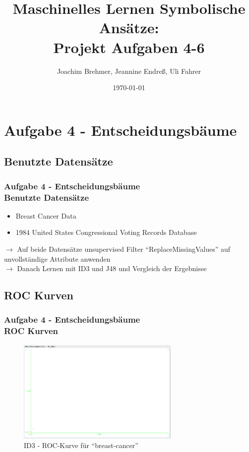 \documentclass[accentcolor=tud6b,colorbacktitle,inverttitle,landscape,german,presentation,t]{tudbeamer}
\begin{document}
\title[MLDM: Projekt Aufg 4-6]{Maschinelles Lernen Symbolische Ansätze:\\ Projekt Aufgaben 4-6}
\subtitle{}

\author[brehmer\_endreß\_fahrer]{Joachim Brehmer, Jeannine Endreß, Uli Fahrer}

\date{\today}

\begin{titleframe}
\tableofcontents
\end{titleframe}

    \section{Aufgabe 4 - Entscheidungsbäume}
    
    \subsection{Benutzte Datensätze}
    
    \begin{frame}[t]
    \frametitle{Aufgabe 4 - Entscheidungsbäume\\ Benutzte Datensätze}
        \begin{itemize}
            \item Breast Cancer Data
            \item 1984 United States Congressional Voting Records Database
        \end{itemize}
        \vfill
        $\rightarrow$ Auf beide Datensätze unsupervised Filter ``ReplaceMissingValues'' auf unvollständige Attribute anwenden\\
        $\rightarrow$ Danach Lernen mit ID3 und J48 und Vergleich der Ergebnisse
    \end{frame}
    
    \subsection{ROC Kurven}
    
    \begin{frame}[t]
    \frametitle{Aufgabe 4 - Entscheidungsbäume\\ ROC Kurven}
        \begin{figure}[htbp]
            \centering
            \includegraphics[height=5cm]{breastcancer-id3}
            \caption{ID3 - ROC-Kurve für ``breast-cancer''}
        \end{figure}
    \end{frame}
    
\end{document}

